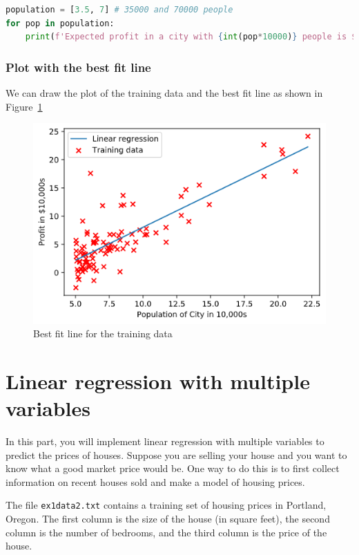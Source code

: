 \documentclass{article}
\begin{document}
\begin{lstlisting}[language=Python]
population = [3.5, 7] # 35000 and 70000 people
for pop in population:
    print(f'Expected profit in a city with {int(pop*10000)} people is ${int(np.dot([1,pop], theta1)[0]*10000)}')
\end{lstlisting}

\subsubsection{Plot with the best fit line}
We can draw the plot of the training data and the best fit line as shown in Figure~\ref{fig:bestfit}

\begin{figure}[h!]
  \centering
  \includegraphics[scale=0.6]{bestfit.png}
  \caption{Best fit line for the training data}
  \label{fig:bestfit}
\end{figure}

\section{Linear regression with multiple variables}

In this part, you will implement linear regression with multiple variables to predict the prices of houses. Suppose you are selling your house and you want to know what a good market price would be. One way to do this is to first collect information on recent houses sold and make a model of housing prices.

The file \texttt{ex1data2.txt} contains a training set of housing prices in Portland, Oregon. The first column is the size of the house (in square feet), the second column is the number of bedrooms, and the third column is the price of the house.
\end{document}
